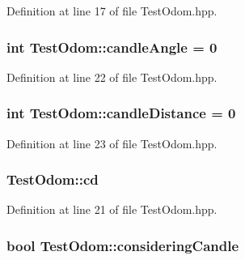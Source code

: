 Definition at line 17 of file Test\-Odom.\-hpp.

\hypertarget{classTestOdom_a5645cf7c9e70140e5b7b96d3168e8006}{
\subsubsection[{candle\-Angle}]{\setlength{\rightskip}{0pt plus 5cm}int Test\-Odom\-::candle\-Angle = 0\hspace{0.3cm}{\ttfamily [private]}}}\label{classTestOdom_a5645cf7c9e70140e5b7b96d3168e8006}


Definition at line 22 of file Test\-Odom.\-hpp.

\hypertarget{classTestOdom_a64c15d32fcf64aa273cc19f210accd35}{
\subsubsection[{candle\-Distance}]{\setlength{\rightskip}{0pt plus 5cm}int Test\-Odom\-::candle\-Distance = 0\hspace{0.3cm}{\ttfamily [private]}}}\label{classTestOdom_a64c15d32fcf64aa273cc19f210accd35}


Definition at line 23 of file Test\-Odom.\-hpp.

\hypertarget{classTestOdom_a4ea35bef135d6bf40b9377ae6c38f1d9}{
\subsubsection[{cd}]{ Test\-Odom\-::cd\hspace{0.3cm}{\ttfamily [private]}}}\label{classTestOdom_a4ea35bef135d6bf40b9377ae6c38f1d9}


Definition at line 21 of file Test\-Odom.\-hpp.

\hypertarget{classTestOdom_aacd35fc57d03d28c22cda5c414ae72fb}{
\subsubsection[{considering\-Candle}]{\setlength{\rightskip}{0pt plus 5cm}bool Test\-Odom\-::considering\-Candle\hspace{0.3cm}{\ttfamily [private]}}}\label{classTestOdom_aacd35fc57d03d28c22cda5c414ae72fb}


